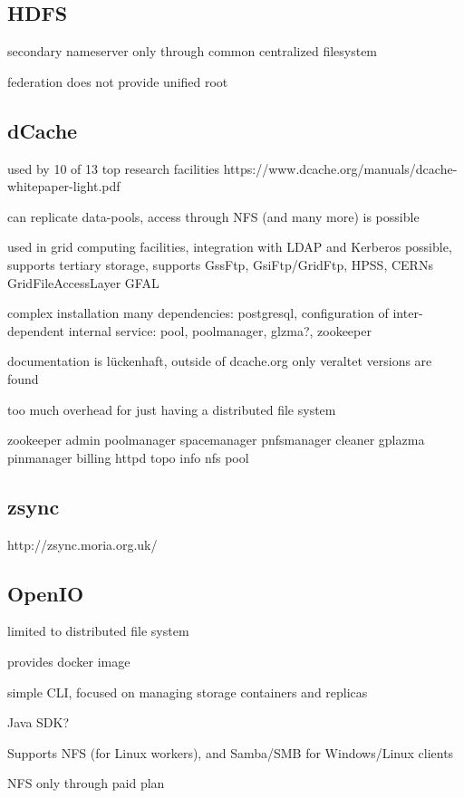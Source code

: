 \subsection{HDFS}

secondary nameserver only through common centralized filesystem

federation does not provide unified root


\subsection{dCache}

used by 10 of 13 top research facilities 
https://www.dcache.org/manuals/dcache-whitepaper-light.pdf

can replicate data-pools, access through NFS (and many more) is possible

used in grid computing facilities, integration with LDAP and Kerberos possible, supports tertiary storage, supports GssFtp, GsiFtp/GridFtp, HPSS, CERNs GridFileAccessLayer GFAL

complex installation
many dependencies: postgresql, configuration of inter-dependent internal service: pool, poolmanager, glzma?, zookeeper

documentation is lückenhaft, outside of dcache.org only veraltet versions are found

too much overhead for just having a distributed file system

zookeeper
admin
poolmanager
spacemanager
pnfsmanager
cleaner
gplazma
pinmanager
billing
httpd
topo
info
nfs
pool


\subsection{zsync}
http://zsync.moria.org.uk/

\subsection{OpenIO}

limited to distributed file system

provides docker image

simple CLI, focused on managing storage containers and replicas

Java SDK?

Supports NFS (for Linux workers), and Samba/SMB for Windows/Linux clients

NFS only through paid plan

